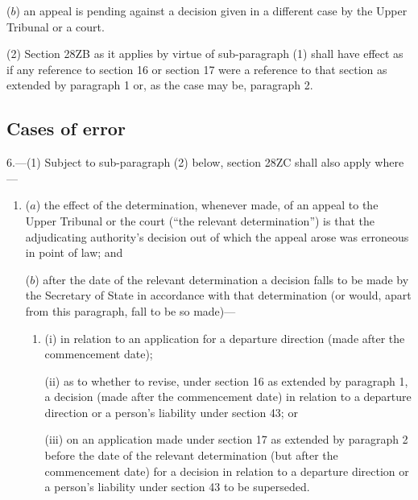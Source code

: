 \documentclass[a4paper]{article}
\begin{document}
{\begin{enumerate}
($b$) an appeal is pending against a decision given in a different case by the Upper Tribunal or a court.
\end{enumerate}

(2) Section 28ZB as it applies by virtue of sub-paragraph (1) shall have effect as if any reference to section 16 or section 17 were a reference to that section as extended by paragraph 1 or, as the case may be, paragraph 2.


\subsection*{Cases of error}

\begin{sloppypar}
6.---(1) Subject to sub-paragraph (2) below, section 28ZC shall also apply where---
\end{sloppypar}
\begin{enumerate}\item[]
($a$) the effect of the determination, whenever made, of an appeal to the Upper Tribunal or the court (“the relevant determination”) is that the adjudicating authority’s decision out of which the appeal arose was erroneous in point of law; and

($b$) after the date of the relevant determination a decision falls to be made by the Secretary of State in accordance with that determination (or would, apart from this paragraph, fall to be so made)---
\begin{enumerate}\item[]
(i) in relation to an application for a departure direction (made after the commencement date);

(ii) as to whether to revise, under section 16 as extended by paragraph 1, a decision (made after the commencement date) in relation to a departure direction
or a person’s liability under section 43; or

(iii) on an application made under section 17 as extended by paragraph 2 before the date of the relevant determination (but after the commencement date) for a decision in relation to a departure direction
or a person’s liability under section 43 to be superseded.
\end{enumerate}
\end{enumerate}

}
\end{document}

